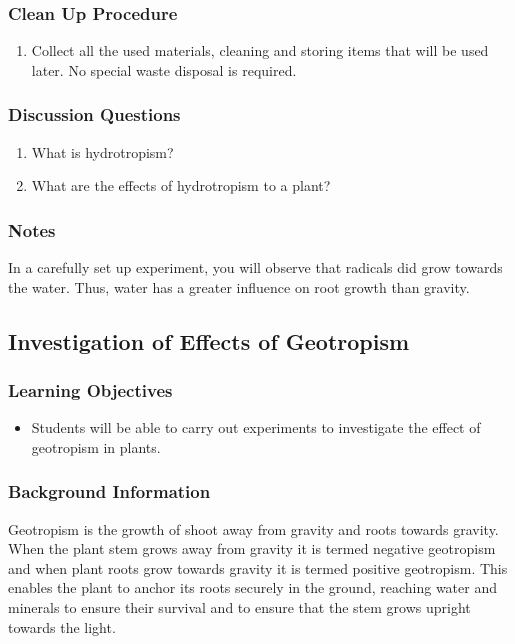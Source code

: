 \subsubsection*{Clean Up Procedure}
\begin{enumerate}
\item{ Collect all the used materials, cleaning and storing items that will be used later. No special waste disposal is required.}
\end{enumerate}

\subsubsection*{Discussion Questions}
\begin{enumerate}
\item{What is hydrotropism?}
\item{What are the effects of hydrotropism to a plant?}
\end{enumerate}

\subsubsection*{Notes}
In a carefully set up experiment, you will observe that radicals did grow towards the water.  Thus, water has a greater influence on root growth than gravity.

\subsection{Investigation of Effects of Geotropism}

\subsubsection*{Learning Objectives}
\begin{itemize}
\item{Students will be able to carry out experiments to investigate the effect of geotropism in plants.}
\end{itemize}

\subsubsection*{Background Information}
Geotropism is the growth of shoot away from gravity and roots towards gravity. When the plant stem grows away from gravity it is termed negative geotropism and when plant roots grow towards gravity it is termed positive geotropism. This enables the plant to anchor its roots securely in the ground, reaching water and minerals to ensure their survival and to ensure that the stem grows upright towards the light.


